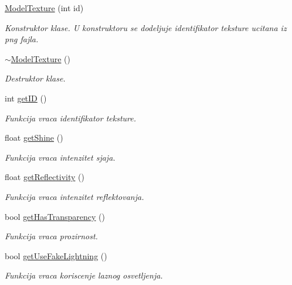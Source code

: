\begin{DoxyCompactItemize}
\item 
\hyperlink{classtexture_1_1ModelTexture_a8a404382554b8e2625978824202c42b9}{Model\+Texture} (int id)
\begin{DoxyCompactList}\small\item\em Konstruktor klase. U konstruktoru se dodeljuje identifikator teksture ucitana iz png fajla. \end{DoxyCompactList}\item 
\hyperlink{classtexture_1_1ModelTexture_ab0ce63043b8241b064a2c233ec24bfae}{$\sim$\+Model\+Texture} ()
\begin{DoxyCompactList}\small\item\em Destruktor klase. \end{DoxyCompactList}\item 
int \hyperlink{classtexture_1_1ModelTexture_a3eeda8235d9c4cfccccc2ac805eeb864}{get\+ID} ()
\begin{DoxyCompactList}\small\item\em Funkcija vraca identifikator teksture. \end{DoxyCompactList}\item 
float \hyperlink{classtexture_1_1ModelTexture_a2336ba8c1ccc1eea9419fb2cd3773888}{get\+Shine} ()
\begin{DoxyCompactList}\small\item\em Funkcija vraca intenzitet sjaja. \end{DoxyCompactList}\item 
float \hyperlink{classtexture_1_1ModelTexture_a613024c969ec176a1add0c20c3f98969}{get\+Reflectivity} ()
\begin{DoxyCompactList}\small\item\em Funkcija vraca intenzitet reflektovanja. \end{DoxyCompactList}\item 
bool \hyperlink{classtexture_1_1ModelTexture_adc0735b6b9c1df9f2c525f0663306cd3}{get\+Has\+Transparency} ()
\begin{DoxyCompactList}\small\item\em Funkcija vraca prozirnost. \end{DoxyCompactList}\item 
bool \hyperlink{classtexture_1_1ModelTexture_adc202fd47232d085312fea26bc17d69e}{get\+Use\+Fake\+Lightning} ()
\begin{DoxyCompactList}\small\item\em Funkcija vraca koriscenje laznog osvetljenja. \end{DoxyCompactList}\item 

\end{DoxyCompactItemize}
